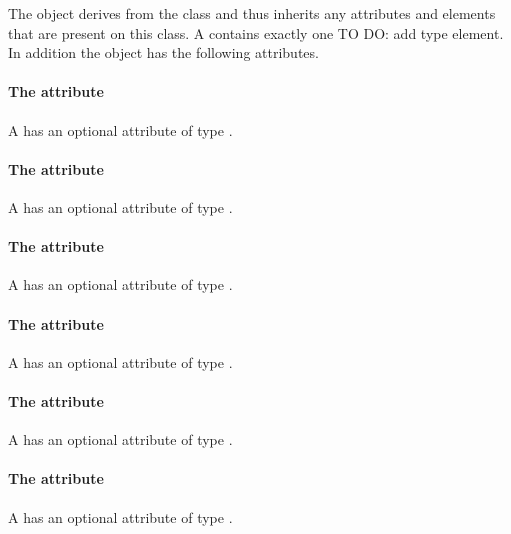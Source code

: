 The \RenderGroup object derives from the 
class and thus inherits any attributes and elements that are present on
this class.
A \RenderGroup contains exactly one TO DO: add type element.
In addition the \RenderGroup object has the following attributes.

\paragraph{The \fixttspace{} attribute}

A \RenderGroup has an optional attribute  of type
.

\paragraph{The \fixttspace{} attribute}

A \RenderGroup has an optional attribute  of type
.

\paragraph{The \fixttspace{} attribute}

A \RenderGroup has an optional attribute  of type
.

\paragraph{The \fixttspace{} attribute}

A \RenderGroup has an optional attribute  of type
\FontWeight.

\paragraph{The \fixttspace{} attribute}

A \RenderGroup has an optional attribute  of type
\FontStyle.

\paragraph{The \fixttspace{} attribute}

A \RenderGroup has an optional attribute  of type
\HTextAnchor.

